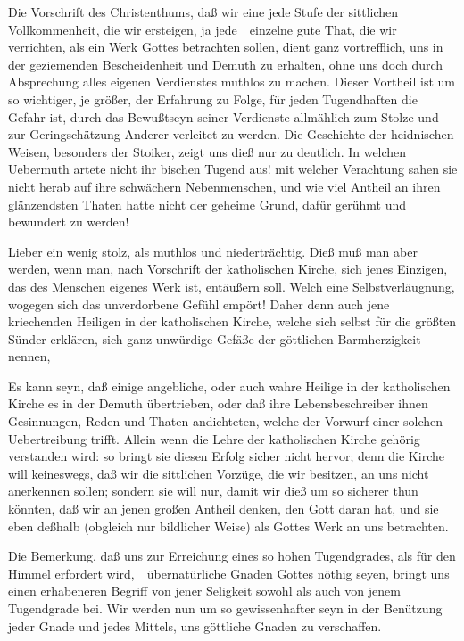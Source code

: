 \begin{aufza}
\item Die Vorschrift des Christenthums, daß wir eine jede Stufe der sittlichen Vollkommenheit, die wir ersteigen, ja jede~\ einzelne gute That, die wir verrichten, als ein Werk Gottes betrachten sollen, dient ganz vortrefflich, uns in der geziemenden Bescheidenheit und Demuth zu erhalten, ohne uns doch durch Absprechung alles eigenen Verdienstes muthlos zu machen. Dieser Vortheil ist um so wichtiger, je größer, der Erfahrung zu Folge, für jeden Tugendhaften die Gefahr ist, durch das Bewußtseyn seiner Verdienste allmählich zum Stolze und zur Geringschätzung Anderer verleitet zu werden. Die Geschichte der heidnischen Weisen, besonders der Stoiker, zeigt uns dieß nur zu deutlich. In welchen Uebermuth artete nicht ihr bischen Tugend aus! mit welcher Verachtung sahen sie nicht herab auf ihre schwächern Nebenmenschen, und wie viel Antheil an ihren glänzendsten Thaten hatte nicht der geheime Grund, dafür gerühmt und bewundert zu werden!\par
{} Lieber ein wenig stolz, als muthlos und niederträchtig. Dieß muß man aber werden, wenn man, nach Vorschrift der katholischen Kirche, sich jenes Einzigen, das des Menschen eigenes Werk ist, entäußern soll. Welch eine  Selbstverläugnung, wogegen sich das unverdorbene Gefühl empört! Daher denn auch jene kriechenden Heiligen in der katholischen Kirche, welche sich selbst für die größten Sünder erklären, sich ganz unwürdige Gefäße der göttlichen Barmherzigkeit nennen, \usw\par
{} Es kann seyn, daß einige angebliche, oder auch wahre Heilige in der katholischen Kirche es in der Demuth übertrieben, oder daß ihre Lebensbeschreiber ihnen Gesinnungen, Reden und Thaten andichteten, welche der Vorwurf einer solchen Uebertreibung trifft. Allein wenn die Lehre der katholischen Kirche gehörig verstanden wird: so bringt sie diesen Erfolg sicher nicht hervor; denn die Kirche will keineswegs, daß wir die sittlichen Vorzüge, die wir besitzen, an uns nicht anerkennen sollen; sondern sie will nur, damit wir dieß um so sicherer thun könnten, daß wir an jenen großen Antheil denken, den Gott daran hat, und sie eben deßhalb (obgleich nur bildlicher Weise) als Gottes Werk an uns betrachten.
\item Die Bemerkung, daß uns zur Erreichung eines so hohen Tugendgrades, als für den Himmel erfordert wird,~\ übernatürliche Gnaden Gottes nöthig seyen, bringt uns einen erhabeneren Begriff von jener Seligkeit sowohl als auch von jenem Tugendgrade bei. Wir werden nun um so gewissenhafter seyn in der Benützung jeder Gnade und jedes Mittels, uns göttliche Gnaden zu verschaffen.

\end{aufza}
